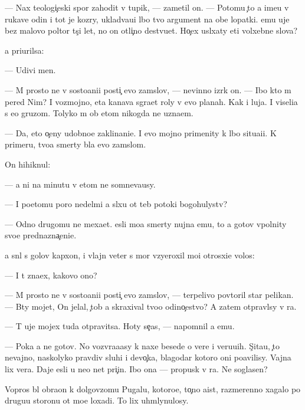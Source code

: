 \documentclass[10pt]{book}
\begin{document}
— Nax teologi{\c}eski{\y} spor zahodit v tupik, — zametil on. — Potomu {\c}to {\y}a ime{\y}u v rukave odin i tot je koz{\yi}ry, uklad{\yi}va{\y}u{\x}i{\y} l{\iu}bo{\y} tvo{\y} argument na obe lopatki. {\Y}emu uje bez malovo poltor{\yi} t{\yi}s{\ia}{\c}i let, no on otli{\c}no de{\y}stvu{\y}et. Ho{\c}ex usl{\yi}xaty eti volxebn{\yi}{\y}e slova?

{\Y}a pri{\x}urilsa:

— Udivi men{\ia}.

— M{\yi} prosto ne v sosto{\y}ani{\y}i posti{\c} {\Y}evo zam{\yi}slov, — nevinno izr{\e}k on. — Ibo kto m{\yi} pered Nim? I vozmojno, eta kanava s{\yi}gra{\y}et roly v {\Y}evo planah. Kak i luja. I viseli{\q}a s {\y}e{\y}o gruzom. Tolyko m{\yi} ob etom nikogda ne uzna{\y}em.

— Da, eto o{\c}eny udobno{\y}e zaklinani{\y}e. I {\y}evo mojno primenity k l{\iu}bo{\y} situa{\q}i{\y}i. K primeru, tvo{\y}a smerty b{\yi}la {\y}evo zam{\yi}slom.

On hihiknul:

— {\Y}a ni na minutu v etom ne somneva{\y}usy.

— I poetomu poro{\y} nedel{\ia}mi {\y}a sl{\yi}xu ot teb{\ia} potoki bogohulystv?

— Odno drugomu ne mexa{\y}et. {\Y}esli mo{\y}a smerty nujna {\Y}emu, to {\y}a gotov v{\yi}polnity svo{\y}e prednazna{\c}eni{\y}e.

{\Y}a sn{\ia}l s golov{\yi} kap{\iu}xon, i vlajn{\yi}{\y} veter s mor{\ia} vzyeroxil mo{\y}i otrosxi{\y}e volos{\yi}:

— I t{\yi} zna{\y}ex, kakovo ono?

— M{\yi} prosto ne v sosto{\y}ani{\y}i posti{\c} {\Y}evo zam{\yi}slov, — terpelivo povtoril star{\yi}{\y} pelikan. — B{\yi}ty mojet, On jelal, {\c}tob{\yi} {\y}a skraxival tvo{\y}o odino{\c}estvo? A zatem otpravl{\iu}sy v ra{\y}.

— T{\yi} uje mojex tuda otpravitsa. Hoty se{\y}{\c}as, — napomnil {\y}a {\y}emu.

— Poka {\y}a ne gotov. No vozvra{\x}a{\y}asy k naxe{\y} besede o vere i veru{\y}u{\x}ih. S{\c}ita{\y}u, {\c}to nevajno, naskolyko pravdiv{\yi} sluhi i devo{\c}ka, blagodar{\ia} kotoro{\y} oni po{\y}avilisy. Vajna lix vera. Daje {\y}esli u ne{\y}o net pri{\c}in{\yi}. Ibo ona — propusk v ra{\y}. Ne soglasen?

Vopros b{\yi}l obra{\x}on k dolgov{\ia}zomu Pugalu, kotoro{\y}e, to{\c}no aist, razmerenno xagalo po drugu{\y}u storonu ot mo{\y}e{\y} loxadi. To lix uhm{\yi}lynulosy.
\end{document}
